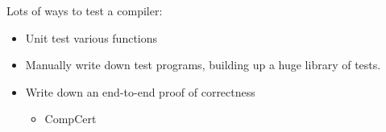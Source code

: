 \documentclass{beamer}
\begin{document}

\begin{frame}
  \frametitle{}

  Lots of ways to test a compiler:

  \begin{itemize}
  \item Unit test various functions
  \item Manually write down test programs, building up a huge library
    of tests.
  \item Write down an end-to-end proof of correctness
    \begin{itemize}
    \item CompCert
    \end{itemize}
  \end{itemize}



  \pause
\end{frame}
\end{document}
